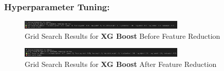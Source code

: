 \documentclass[a4paper,12pt]{article}
\begin{document}
\subsubsection{Hyperparameter Tuning:}
\begin{figure}[H]
    \centering
    \includegraphics[width=0.7\textwidth]{./images/gsxgb1.png}
    \caption{Grid Search Results for \textbf{XG Boost} Before Feature Reduction}
    \label{fig:fig_23}
\end{figure}
\begin{figure}[H]
    \centering
    \includegraphics[width=0.7\textwidth]{./images/gsxg2.png}
    \caption{Grid Search Results for \textbf{XG Boost} After Feature Reduction}
    \label{fig:fig_24}
\end{figure}
\end{document}
